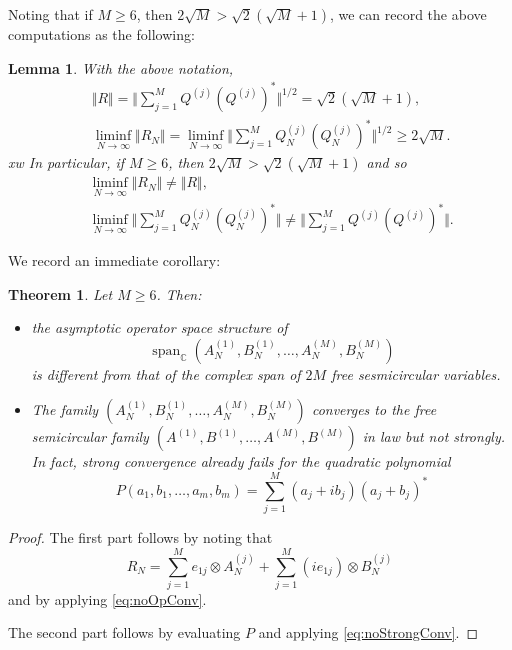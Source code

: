 \documentclass[11pt]{article}
\newtheorem{theorem}{Theorem}
\newtheorem{lemma}{Lemma}
\begin{document}
Noting that if $M\geq 6$, then $2\sqrt{M} > \sqrt{2}(\sqrt{M}+1)$, we can record the above computations as the following: 
\begin{lemma}
    \label{lemma:WrongOperatorSpaceStructure}
    With the above notation, 
    \begin{eqnarray} && \Vert R \Vert = \Big\Vert \sum_{j=1}^M Q^{(j)} (Q^{(j)})^* \Big\Vert^{1/2} = \sqrt{2}(\sqrt{M}+1),\\ && \liminf_{N\to\infty}  \Vert R_N \Vert = 
    \liminf_{N\to\infty} \Big\Vert \sum_{j=1}^M Q_N^{(j)} (Q_N^{(j)})^*\Big\Vert^{1/2} \geq 2\sqrt{M}.\end{eqnarray} xw
    In particular, if $M\geq 6$, then $2\sqrt{M}>\sqrt{2}(\sqrt{M}+1)$ and so \begin{eqnarray}
        &&\liminf_{N\to\infty} \Vert R_N\Vert \neq \Vert R \Vert,\label{eq:noOpConv}\\
        &&\liminf_{N\to\infty}\Big\Vert \sum_{j=1}^M Q_N^{(j)} (Q_N^{(j)})^*\Big\Vert \neq \Big\Vert \sum_{j=1}^M Q^{(j)} (Q^{(j)})^* \Big\Vert.\label{eq:noStrongConv}
    \end{eqnarray} 
\end{lemma}
We record an immediate corollary: 

\begin{theorem}
   \label{thrm:noStrong}
    Let $M\geq 6$.  Then: 
    \begin{itemize}
    \item[(i)] the asymptotic operator space structure of  $$\operatorname{span}_\mathbb{C}(A_N^{(1)},B_N^{(1)},\dots,A_N^{(M)},B_N^{(M)})$$  is different from that of the complex span of $2M$ free sesmicircular variables.  
    \item[(ii)] The family $(A_N^{(1)},B_N^{(1)},\dots,A_N^{(M)},B_N^{(M)})$ converges to the free semicircular family $(A^{(1)},B^{(1)},\dots,A^{(M)},B^{(M)})$ in law but not strongly. In fact, strong convergence already fails for the quadratic polynomial $$P(a_1,b_1,\dots,a_m,b_m)=\sum_{j=1}^M  (a_j + i b_j)(a_j + b_j)^*$$
    \end{itemize}
\end{theorem}
\begin{proof}
    The first part follows by  noting that $$R_N =  \sum_{j=1}^M e_{1j} \otimes A_N^{(j)} + \sum_{j=1}^M (i e_{1j})\otimes B_N^{(j)}$$ and by applying \eqref{eq:noOpConv}.

    The second part follows by evaluating $P$ and applying \eqref{eq:noStrongConv}.
\end{proof}
\end{document}
